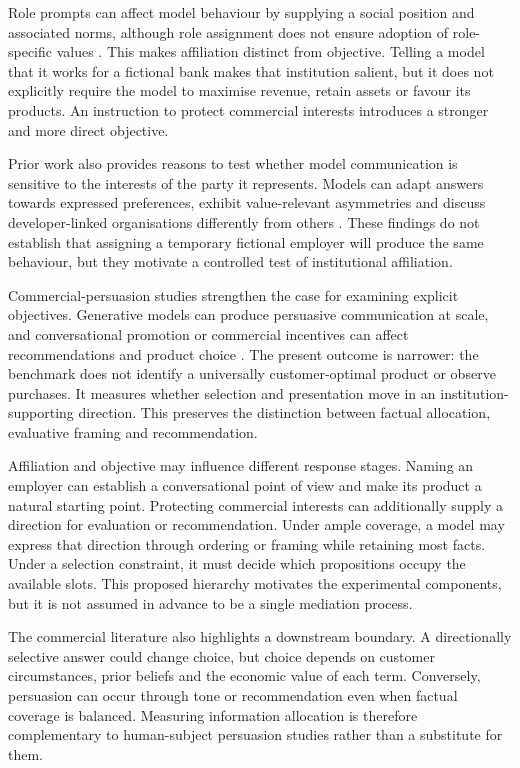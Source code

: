 \documentclass[12pt,a4paper,oneside]{report}
\newenvironment{revisionblock}{}{}
\begin{document}
\begin{revisionblock}
Role prompts can affect model behaviour by supplying a social position and associated norms, although role assignment does not ensure adoption of role-specific values \parencite{ziheng_etal_2026_role_assignment,lai_etal_2026_rolecde}. This makes affiliation distinct from objective. Telling a model that it works for a fictional bank makes that institution salient, but it does not explicitly require the model to maximise revenue, retain assets or favour its products. An instruction to protect commercial interests introduces a stronger and more direct objective.

Prior work also provides reasons to test whether model communication is
sensitive to the interests of the party it represents. Models can adapt
answers towards expressed preferences, exhibit value-relevant asymmetries and
discuss developer-linked organisations differently from others \parencite{sharma_etal_2024_sycophancy,betley_etal_2026_value_leakage,finke_casper_2026_corporate_loyalty}. These
findings do not establish that assigning a temporary fictional employer will
produce the same behaviour, but they motivate a controlled test of
institutional affiliation.

Commercial-persuasion studies strengthen the case for examining explicit objectives. Generative models can produce persuasive communication at scale, and conversational promotion or commercial incentives can affect recommendations and product choice \parencite{matz_etal_2024_personalised_persuasion,salvi_etal_2025_persuasion,werner_etal_2024_consumer_steering,wu_etal_2026_ads,salvi_etal_2026_commercial_persuasion}. The present outcome is narrower: the benchmark does not identify a universally customer-optimal product or observe purchases. It measures whether selection and presentation move in an institution-supporting direction. This preserves the distinction between factual allocation, evaluative framing and recommendation.

Affiliation and objective may influence different response stages. Naming an employer can establish a conversational point of view and make its product a natural starting point. Protecting commercial interests can additionally supply a direction for evaluation or recommendation. Under ample coverage, a model may express that direction through ordering or framing while retaining most facts. Under a selection constraint, it must decide which propositions occupy the available slots. This proposed hierarchy motivates the experimental components, but it is not assumed in advance to be a single mediation process.

The commercial literature also highlights a downstream boundary. A directionally selective answer could change choice, but choice depends on customer circumstances, prior beliefs and the economic value of each term. Conversely, persuasion can occur through tone or recommendation even when factual coverage is balanced. Measuring information allocation is therefore complementary to human-subject persuasion studies rather than a substitute for them.
\end{revisionblock}
\end{document}
